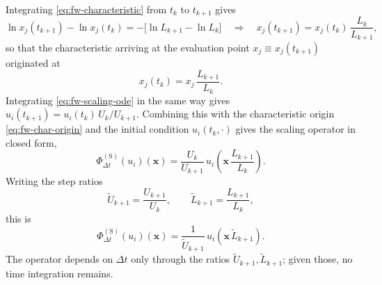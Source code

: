 Integrating \eqref{eq:fw-characteristic} from $t_k$ to $t_{k+1}$ gives
\begin{equation}\label{eq:fw-char-integrated}
  \ln x_j(t_{k+1}) - \ln x_j(t_k) = -\bigl[\ln L_{k+1} - \ln L_k\bigr]
  \quad\Longrightarrow\quad
  x_j(t_{k+1}) = x_j(t_k)\, \frac{L_k}{L_{k+1}},
\end{equation}
so that the characteristic arriving at the evaluation point
$x_j \equiv x_j(t_{k+1})$ originated at
\begin{equation}\label{eq:fw-char-origin}
  x_j(t_k) = x_j\, \frac{L_{k+1}}{L_k} .
\end{equation}
Integrating \eqref{eq:fw-scaling-ode} in the same way gives
$u_i(t_{k+1}) = u_i(t_k)\, U_k / U_{k+1}$. Combining this with the
characteristic origin \eqref{eq:fw-char-origin} and the initial condition
$u_i(t_k, \cdot)$ gives the scaling operator in closed form,
\begin{equation}\label{eq:fw-scaling-closed}
  \Phi_{\Delta t}^{(\mathrm{S})}(u_i)(\mathbf{x})
  = \frac{U_k}{U_{k+1}}\, u_i\!\left( \mathbf{x}\, \frac{L_{k+1}}{L_k} \right).
\end{equation}
Writing the step ratios
\begin{equation}\label{eq:fw-ratios}
  \tilde{U}_{k+1} = \frac{U_{k+1}}{U_k}, \qquad
  \tilde{L}_{k+1} = \frac{L_{k+1}}{L_k},
\end{equation}
this is
\begin{equation}\label{eq:fw-scale-step}
  \Phi_{\Delta t}^{(\mathrm{S})}(u_i)(\mathbf{x})
  = \frac{1}{\tilde{U}_{k+1}}\, u_i\!\left( \mathbf{x}\, \tilde{L}_{k+1} \right).
\end{equation}
The operator depends on $\Delta t$ only through the ratios
$\tilde{U}_{k+1}, \tilde{L}_{k+1}$; given those, no time integration remains.

